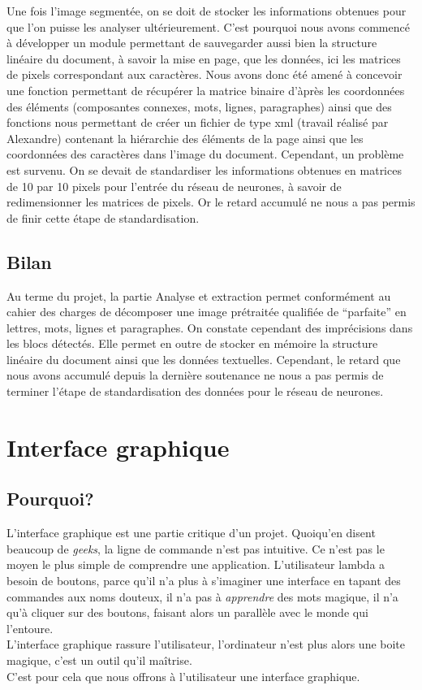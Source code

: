 \documentclass[a4paper,12pt]{report}
\begin{document}
Une fois l'image segment\'ee, on se doit de stocker les informations obtenues pour que l'on puisse
les analyser ult\'erieurement. C'est pourquoi nous avons commenc\'e \`a d\'evelopper un module
permettant de sauvegarder aussi bien la structure lin\'eaire du document, \`a savoir la mise en page,
que les donn\'ees, ici les matrices de pixels correspondant aux caract\`eres. Nous avons donc \'et\'e
amen\'e \`a concevoir une fonction permettant de r\'ecup\'erer la matrice binaire d'\`apr\`es les coordonn\'ees
des \'el\'ements (composantes connexes, mots, lignes, paragraphes) ainsi que des fonctions nous permettant de
cr\'eer un fichier de type xml (travail r\'ealis\'e par Alexandre) contenant la hi\'erarchie des \'el\'ements
de la page ainsi que les coordonn\'ees des caract\`eres dans l'image du document. Cependant, un probl\`eme est
survenu. On se devait de standardiser les informations obtenues en matrices de 10 par 10 pixels pour l'entr\'ee
du r\'eseau de neurones, \`a savoir de redimensionner les matrices de pixels.
Or le retard accumul\'e ne nous a pas permis de finir cette \'etape de standardisation.


\section{Bilan}

Au terme du projet, la partie Analyse et extraction permet conformément au cahier des
charges de décomposer une image prétraitée qualifiée de ``parfaite'' en lettres, mots, lignes
et paragraphes. On constate cependant des imprécisions dans les blocs détectés. Elle
permet en outre de stocker en mémoire la structure linéaire du document ainsi que les
données textuelles. Cependant, le retard que nous avons accumulé depuis la dernière
soutenance ne nous a pas permis de terminer l'étape de standardisation des données pour
le réseau de neurones.



\chapter{Interface graphique} %
\label{cha:interface_graphique}

\section{Pourquoi?} %
\label{sec:pourquoi_}
L’interface graphique est une partie critique d’un projet. Quoiqu’en disent beaucoup de \emph{geeks}, la ligne de commande n’est pas intuitive. Ce n’est pas le moyen le plus simple de comprendre une application. L’utilisateur lambda a besoin de boutons, parce qu’il n’a plus à s’imaginer une interface en tapant des commandes aux noms douteux, il n’a pas à \emph{apprendre} des mots magique, il n’a qu’à cliquer sur des boutons, faisant alors un parallèle avec le monde qui l’entoure. \\
L’interface graphique rassure l’utilisateur, l’ordinateur n’est plus alors une boite magique, c’est un outil qu’il maîtrise. \\
C’est pour cela que nous offrons à l’utilisateur une interface graphique.\\
\end{document}
